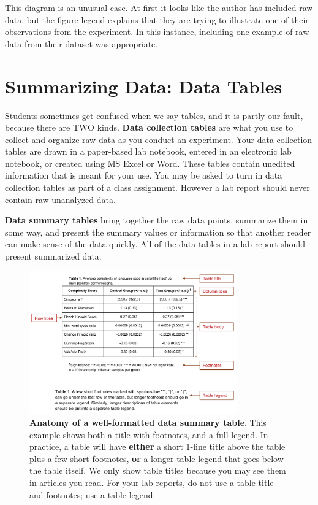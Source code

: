 \documentclass[
]{book}
\begin{document}
This diagram is an unusual case. At first it looks like the author has included raw data, but the figure legend explains that they are trying to illustrate one of their observations from the experiment. In this instance, including one example of raw data from their dataset was appropriate.

\hypertarget{tables435}{%
\chapter{Summarizing Data: Data Tables}\label{tables435}}

Students sometimes get confused when we say tables, and it is partly our fault, because there are TWO kinds. \textbf{Data collection tables} are what you use to collect and organize raw data as you conduct an experiment. Your data collection tables are drawn in a paper-based lab notebook, entered in an electronic lab notebook, or created using MS Excel or Word. These tables contain unedited information that is meant for your use. You may be asked to turn in data collection tables as part of a class assignment. However a lab report should never contain raw unanalyzed data.

\textbf{Data summary tables} bring together the raw data points, summarize them in some way, and present the summary values or information so that another reader can make sense of the data quickly. All of the data tables in a lab report should present summarized data.

\begin{figure}
\centering
\includegraphics[width=0.8\textwidth,height=\textheight]{images/Table-annotated.png}
\caption{\textbf{Anatomy of a well-formatted data summary table}. This example shows both a title with footnotes, and a full legend. In practice, a table will have \textbf{either} a short 1-line title above the table plus a few short footnotes, \textbf{or} a longer table legend that goes below the table itself. We only show table titles because you may see them in articles you read. For your lab reports, do not use a table title and footnotes; use a table legend.}
\end{figure}
\end{document}
